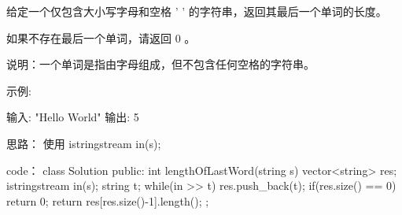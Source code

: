 给定一个仅包含大小写字母和空格 ' ' 的字符串，返回其最后一个单词的长度。

如果不存在最后一个单词，请返回 0 。

说明：一个单词是指由字母组成，但不包含任何空格的字符串。

示例:

输入: "Hello World"
输出: 5



























思路：
使用 istringstream in(s);






















code：
class Solution {
public:
    int lengthOfLastWord(string s) {
        vector<string> res;
        istringstream in(s);
        string t;
        while(in >> t)
            res.push_back(t);
        if(res.size() == 0) return 0;
        return res[res.size()-1].length();
    }
};